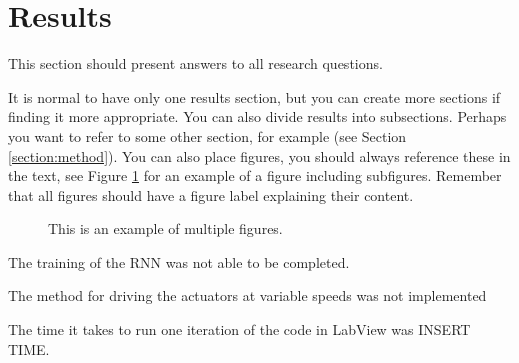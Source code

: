 \section{Results}
\label{section:results}
This section should present answers to all research questions.

It is normal to have only one results section, but you can create more sections if finding it more appropriate. You can
also divide results into subsections. Perhaps you want to refer to some other section, for example (see Section \ref{section:method}).
You can also place figures, you should always reference these in the text, see Figure \ref{fig:MDHlogga} for an example of a figure
including subfigures. Remember that all figures should have a figure label explaining their content.


\begin{figure}[H]
    \centering
    \qquad
    \qquad
    \caption[Short text]{This is an example of multiple figures.}
    \label{fig:MDHlogga}
\end{figure}




The training of the RNN was not able to be completed.

The method for driving the actuators at variable speeds was not implemented

The time it takes to run one iteration of the code in LabView was INSERT TIME.